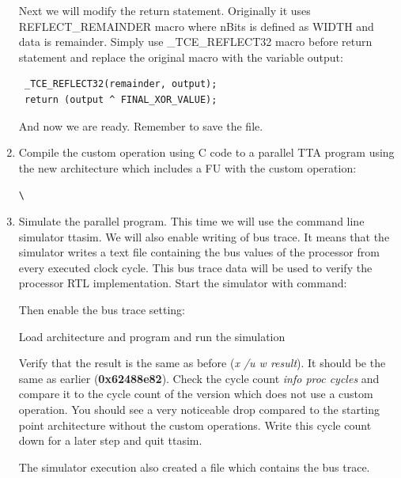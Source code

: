 \documentclass[twoside]{tceusermanual}
\begin{document}
\begin{enumerate}
Next we will modify the return statement. Originally it uses
REFLECT\_REMAINDER macro where nBits is defined as WIDTH and data is
remainder. Simply use \_TCE\_REFLECT32 macro before return statement and
replace the original macro with the variable output:

\begin{verbatim}
 _TCE_REFLECT32(remainder, output);
 return (output ^ FINAL_XOR_VALUE);
\end{verbatim}

And now we are ready. Remember to save the file.

\item%
Compile the custom operation using C code to a parallel TTA program using the new 
architecture which includes a FU with the custom operation:

\verb#\#\\

\item%
Simulate the parallel program. This time we will use the command line simulator
ttasim. We will also enable writing of bus trace. It means that the simulator
writes a text file containing the bus values of the processor from every
executed clock cycle. This bus trace data will be used to verify the processor
RTL implementation. Start the simulator with command:


Then enable the bus trace setting:


Load architecture and program and run the simulation




Verify that the result is the same as before (\textit{x /u w result}). It
should be the same as earlier (\textbf{0x62488e82}).
Check the cycle count \textit{info proc cycles}  %
and compare it to the cycle 
count of the version which does not use a custom operation. You should see 
a very noticeable drop compared to the starting point architecture without
the custom operations. Write this cycle count down for a later step and quit ttasim.

The simulator execution also created a file
 which contains the bus
trace.

\end{enumerate}
\end{document}
